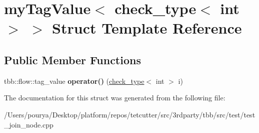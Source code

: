 \hypertarget{structmyTagValue_3_01check__type_3_01int_01_4_01_4}{}\section{my\+Tag\+Value$<$ check\+\_\+type$<$ int $>$ $>$ Struct Template Reference}
\label{structmyTagValue_3_01check__type_3_01int_01_4_01_4}
\subsection*{Public Member Functions}
\begin{DoxyCompactItemize}
\item 
\hypertarget{structmyTagValue_3_01check__type_3_01int_01_4_01_4_aabbc5451cb858afbad3414ef3c8107d5}{}tbb\+::flow\+::tag\+\_\+value {\bfseries operator()} (\hyperlink{classcheck__type}{check\+\_\+type}$<$ int $>$ i)\label{structmyTagValue_3_01check__type_3_01int_01_4_01_4_aabbc5451cb858afbad3414ef3c8107d5}

\end{DoxyCompactItemize}


The documentation for this struct was generated from the following file\+:\begin{DoxyCompactItemize}
\item 
/\+Users/pourya/\+Desktop/platform/repos/tetcutter/src/3rdparty/tbb/src/test/test\+\_\+join\+\_\+node.\+cpp\end{DoxyCompactItemize}
